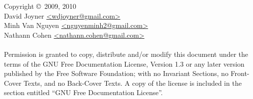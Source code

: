 \noindent Copyright \copyright\ 2009, 2010 \\
David Joyner \url{<wdjoyner@gmail.com>} \\
Minh Van Nguyen \url{<nguyenminh2@gmail.com>} \\
Nathann Cohen \url{<nathann.cohen@gmail.com>} \\\\
Permission is granted to copy, distribute and/or modify this document
under the terms of the GNU Free Documentation License, Version 1.3
or any later version published by the Free Software Foundation;
with no Invariant Sections, no Front-Cover Texts, and no
Back-Cover Texts. A copy of the license is included in the section
entitled ``GNU Free Documentation License''.
